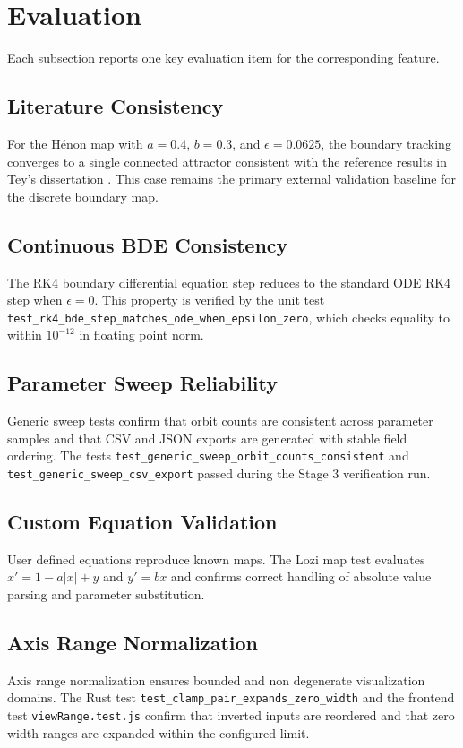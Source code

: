 \documentclass[11pt,twocolumn]{article}
\begin{document}
\section{Evaluation}
Each subsection reports one key evaluation item for the corresponding feature.

\subsection{Literature Consistency}
For the H\'enon map with $a = 0.4$, $b = 0.3$, and $\epsilon = 0.0625$, the boundary tracking converges to a single connected attractor consistent with the reference results in Tey's dissertation \cite{tey2022}. This case remains the primary external validation baseline for the discrete boundary map.

\subsection{Continuous BDE Consistency}
The RK4 boundary differential equation step reduces to the standard ODE RK4 step when $\epsilon = 0$. This property is verified by the unit test \texttt{test\_rk4\_bde\_step\_matches\_ode\_when\_epsilon\_zero}, which checks equality to within $10^{-12}$ in floating point norm.

\subsection{Parameter Sweep Reliability}
Generic sweep tests confirm that orbit counts are consistent across parameter samples and that CSV and JSON exports are generated with stable field ordering. The tests \texttt{test\_generic\_sweep\_orbit\_counts\_consistent} and \texttt{test\_generic\_sweep\_csv\_export} passed during the Stage 3 verification run.

\subsection{Custom Equation Validation}
User defined equations reproduce known maps. The Lozi map test evaluates $x' = 1 - a |x| + y$ and $y' = b x$ and confirms correct handling of absolute value parsing and parameter substitution.

\subsection{Axis Range Normalization}
Axis range normalization ensures bounded and non degenerate visualization domains. The Rust test \texttt{test\_clamp\_pair\_expands\_zero\_width} and the frontend test \texttt{viewRange.test.js} confirm that inverted inputs are reordered and that zero width ranges are expanded within the configured limit.
\end{document}
